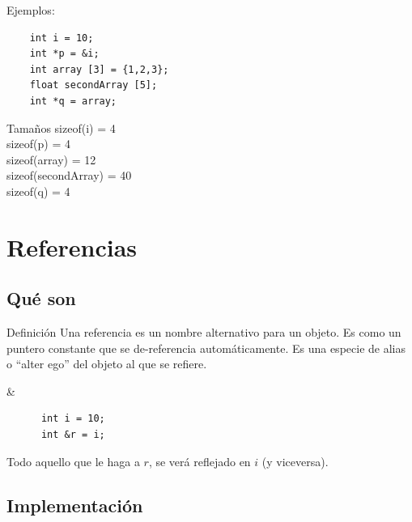 \documentclass[xcolor=table,spanish,9pt]{beamer}
\begin{document}
\begin{frame}[fragile]
  Ejemplos:
  \begin{lstlisting}
    int i = 10;
    int *p = &i;
    int array [3] = {1,2,3};
    float secondArray [5];
    int *q = array;
  \end{lstlisting}
  \begin{block}{Tamaños}
    sizeof(i) = 4\\
    sizeof(p) = 4\\
    sizeof(array) = 12\\
    sizeof(secondArray) = 40\\
    sizeof(q) = 4\\
  \end{block}
\end{frame}



\section{Referencias}

\subsection{Qué son}

\begin{frame}[fragile]
  \begin{alertblock}{Definición}
    Una referencia es un nombre alternativo para un objeto. Es como un puntero constante que se de-referencia automáticamente. 
    Es una especie de alias o ``alter ego'' del objeto al que se refiere.
  \end{alertblock}
  \begin{block}{\&}
    \begin{lstlisting}
      int i = 10;
      int &r = i;
    \end{lstlisting}
    Todo aquello que le haga a $r$, se verá reflejado en $i$ (y viceversa).
  \end{block}
\end{frame}


\subsection{Implementación}
\end{document}
